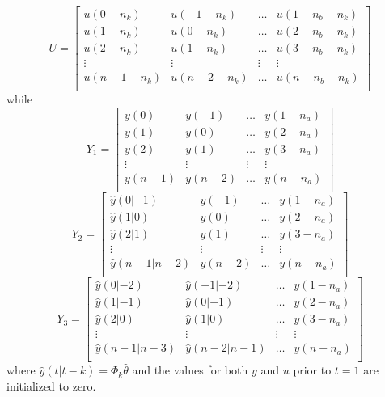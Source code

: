 \documentclass[]{article}
\begin{document}
\begin{equation}
	U = \begin{bmatrix}
		u(0-n_k) & u(-1-n_k) & \ldots & u(1-n_b-n_k) \\
		u(1-n_k) & u(0-n_k) & \ldots & u(2-n_b-n_k) \\
		u(2-n_k) & u(1-n_k) & \ldots & u(3-n_b-n_k) \\
		\vdots & \vdots & \vdots & \vdots \\
		u(n-1-n_k) & u(n-2-n_k) & \ldots & u(n-n_b-n_k) \\
	\end{bmatrix}
\end{equation}
while
\begin{equation}
	Y_1 = \begin{bmatrix}
		y(0) & y(-1) & \ldots & y(1-n_a) \\
		y(1) & y(0) &\ldots & y(2-n_a) \\
		y(2) & y(1) &\ldots & y(3-n_a) \\
		\vdots & \vdots & \vdots & \vdots \\
		y(n-1) & y(n-2) & \ldots & y(n-n_a) \\
	\end{bmatrix}
\end{equation}
\begin{equation}
	Y_2 = \begin{bmatrix}
		\hat{y}(0|-1) & y(-1) & \ldots & y(1-n_a) \\
		\hat{y}(1|0) & y(0) &\ldots & y(2-n_a) \\
		\hat{y}(2|1) & y(1) &\ldots & y(3-n_a) \\
		\vdots & \vdots & \vdots & \vdots \\
		\hat{y}(n-1|n-2) & y(n-2) & \ldots & y(n-n_a) \\
	\end{bmatrix}
\end{equation}
\begin{equation}
Y_3 = \begin{bmatrix}
		\hat{y}(0|-2) & \hat{y}(-1|-2) & \ldots & y(1-n_a) \\
		\hat{y}(1|-1) & \hat{y}(0|-1) &\ldots & y(2-n_a) \\
		\hat{y}(2|0) & \hat{y}(1|0) &\ldots & y(3-n_a) \\
		\vdots & \vdots & \vdots & \vdots \\
		\hat{y}(n-1|n-3) & \hat{y}(n-2|n-1) & \ldots & y(n-n_a) \\
	\end{bmatrix}
\end{equation}
where $\hat{y}(t|t-k) = \Phi_k \hat{\theta}$ and the values for both $y$ and $u$ prior to $t=1$ are initialized to zero.
\end{document}
